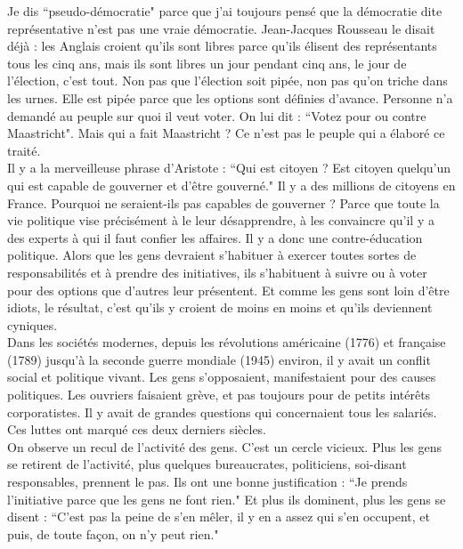 Je dis ``pseudo-démocratie" parce que j’ai toujours pensé que la démocratie dite représentative n’est pas une vraie démocratie. Jean-Jacques Rousseau le disait déjà : les Anglais croient qu’ils sont libres parce qu’ils élisent des représentants tous les cinq ans, mais ils sont libres un jour pendant cinq ans, le jour de l’élection, c’est tout. Non pas que l’élection soit pipée, non pas qu’on triche dans les urnes. Elle est pipée parce que les options sont définies d’avance. Personne n’a demandé au peuple sur quoi il veut voter. On lui dit : ``Votez pour ou contre Maastricht". Mais qui a fait Maastricht ? Ce n’est pas le peuple qui a élaboré ce traité.\\
Il y a la merveilleuse phrase d’Aristote : ``Qui est citoyen ? Est citoyen quelqu’un qui est capable de gouverner et d’être gouverné." Il y a des millions de citoyens en France. Pourquoi ne seraient-ils pas capables de gouverner ? Parce que toute la vie politique vise précisément à le leur désapprendre, à les convaincre qu’il y a des experts à qui il faut confier les affaires. Il y a donc une contre-éducation politique. Alors que les gens devraient s’habituer à exercer toutes sortes de responsabilités et à prendre des initiatives, ils s’habituent à suivre ou à voter pour des options que d’autres leur présentent. Et comme les gens sont loin d’être idiots, le résultat, c’est qu’ils y croient de moins en moins et qu’ils deviennent cyniques.\\
Dans les sociétés modernes, depuis les révolutions américaine (1776) et française (1789) jusqu’à la seconde guerre mondiale (1945) environ, il y avait un conflit social et politique vivant. Les gens s’opposaient, manifestaient pour des causes politiques. Les ouvriers faisaient grève, et pas toujours pour de petits intérêts corporatistes. Il y avait de grandes questions qui concernaient tous les salariés. Ces luttes ont marqué ces deux derniers siècles.\\
On observe un recul de l’activité des gens. C’est un cercle vicieux. Plus les gens se retirent de l’activité, plus quelques bureaucrates, politiciens, soi-disant responsables, prennent le pas. Ils ont une bonne justification : ``Je prends l’initiative parce que les gens ne font rien." Et plus ils dominent, plus les gens se disent : ``C’est pas la peine de s’en mêler, il y en a assez qui s’en occupent, et puis, de toute façon, on n’y peut rien."\\
